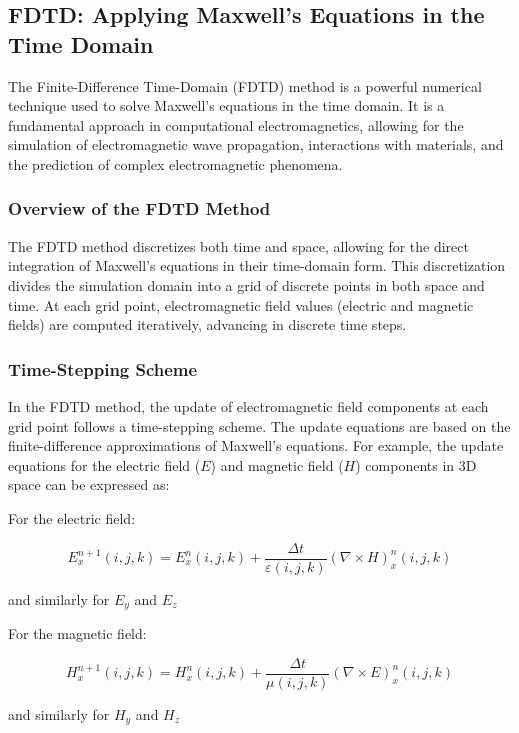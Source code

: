 \newpage
\subsection{FDTD: Applying Maxwell's Equations in the Time Domain}

The Finite-Difference Time-Domain (FDTD) method is a powerful numerical technique used to solve Maxwell's equations in the time domain. It is a fundamental approach in computational electromagnetics, allowing for the simulation of electromagnetic wave propagation, interactions with materials, and the prediction of complex electromagnetic phenomena.

\subsubsection{Overview of the FDTD Method}

The FDTD method discretizes both time and space, allowing for the direct integration of Maxwell's equations in their time-domain form. This discretization divides the simulation domain into a grid of discrete points in both space and time. At each grid point, electromagnetic field values (electric and magnetic fields) are computed iteratively, advancing in discrete time steps.

\subsubsection{Time-Stepping Scheme}

In the FDTD method, the update of electromagnetic field components at each grid point follows a time-stepping scheme. The update equations are based on the finite-difference approximations of Maxwell's equations. For example, the update equations for the electric field (\(E\)) and magnetic field (\(H\)) components in 3D space can be expressed as:

\begin{center} For the electric field: \end{center}
\[
E_x^{n+1}(i,j,k) = E_x^n(i,j,k) + \frac{\Delta t}{\varepsilon(i,j,k)} \left(\nabla \times H\right)_x^n(i,j,k)
\]
\begin{center}and similarly for  $E_y$ and $E_z$\end{center}



\begin{center}For the magnetic field:\end{center}
\[
H_x^{n+1}(i,j,k) = H_x^n(i,j,k) + \frac{\Delta t}{\mu(i,j,k)} \left(\nabla \times E\right)_x^n(i,j,k)
\]
\begin{center}and similarly for $H_y$ and $H_z$\end{center}


